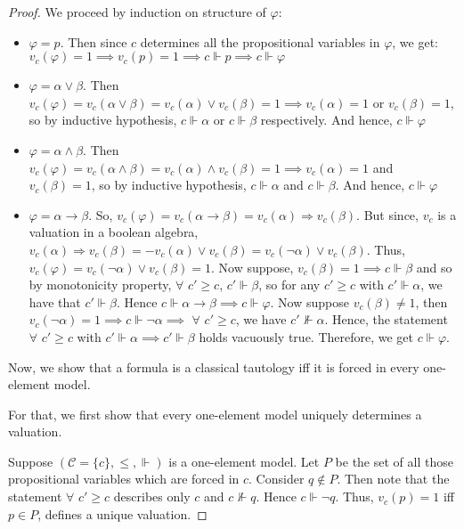 \documentclass[12pt]{article}
\begin{document}
\begin{proof}
We proceed by induction on structure of $\varphi$:

\begin{itemize}
    \item $\varphi = p$. Then since $c$ determines all the propositional variables in $\varphi$, we get:  $v_c(\varphi) = 1 \implies v_c(p) = 1 \implies c \Vdash p \implies c \Vdash \varphi$
    
    \item $\varphi = \alpha \vee \beta$. Then $v_c(\varphi) = v_c(\alpha \vee \beta) = v_c(\alpha) \vee v_c(\beta) = 1 \implies v_c(\alpha) = 1$ or $v_c(\beta) = 1$, so by inductive hypothesis, $c \Vdash \alpha$ or $c \Vdash \beta$ respectively. And hence, $c \Vdash \varphi$
    
    \item $\varphi = \alpha \wedge \beta$. Then $v_c(\varphi) = v_c(\alpha \wedge \beta) = v_c(\alpha) \wedge v_c(\beta) = 1 \implies v_c(\alpha) = 1$ and $v_c(\beta) = 1$, so by inductive hypothesis, $c \Vdash \alpha$ and $c \Vdash \beta$. And hence, $c \Vdash \varphi$
    
    \item $\varphi = \alpha \rightarrow \beta$. So, $v_c(\varphi) = v_c(\alpha \rightarrow \beta) = v_c(\alpha) \Rightarrow v_c(\beta)$. But since, $v_c$ is a valuation in a boolean algebra, $v_c(\alpha) \Rightarrow v_c(\beta) = -v_c(\alpha) \vee v_c(\beta) = v_c(\neg \alpha) \vee v_c(\beta)$. Thus, $v_c(\varphi) = v_c(\neg \alpha) \vee v_c(\beta) = 1$. Now suppose, $v_c(\beta) = 1 \implies c \Vdash \beta$ and so by monotonicity property, $\forall$ $c' \geq c$, $c' \Vdash \beta$, so for any $c' \geq c$ with $c' \Vdash \alpha$, we have that $c' \Vdash \beta$. Hence $c \Vdash \alpha \rightarrow \beta \implies c \Vdash \varphi$. Now suppose $v_c(\beta) \neq 1$, then $v_c(\neg \alpha) = 1 \implies c \Vdash \neg \alpha \implies$ $\forall$ $c' \geq c$, we have $c' \not \Vdash \alpha$. Hence, the statement $\forall$ $c' \geq c$ with $c' \Vdash \alpha \implies c' \Vdash \beta$ holds vacuously true. Therefore, we get $c \Vdash \varphi$.
\end{itemize}

Now, we show that a formula is a classical tautology iff it is forced in every one-element model.

For that, we first show that every one-element model uniquely determines a valuation.

Suppose $(\mathcal{C} = \{c\}, \leq, \Vdash)$ is a one-element model. Let $P$ be the set of all those propositional variables which are forced in $c$. Consider $q \not \in P$. Then note that the statement $\forall$ $c' \geq c$ describes only $c$ and $c \not \Vdash q$. Hence $c \Vdash \neg q$. Thus, $v_c(p) = 1$ iff $p \in P$, defines a unique valuation.


\end{proof}
\end{document}
